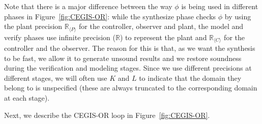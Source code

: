 \documentclass[a4paper,UKenglish]{lipics-v2018}
\newcommand{\mat}[1]{{#1}}
\begin{document}

Note that there is a major difference between the way $\phi$ is being used
in different phases in Figure~\ref{fig:CEGIS-OR}: while the {\sc synthesize}
phase checks $\phi$ by using the plant precision $\mathbb{R}_{\langle P
\rangle}$ for the controller, observer and plant, the {\sc model} and {\sc
verify} phases use infinite precision ($\mathbb{R}$) to represent the plant
and $\mathbb{R}_{\langle C \rangle}$ for the controller and the observer. 
The reason for this is that, as we want the synthesis to be fast, we allow
it to generate unsound results and we restore soundness during the
verification and modeling stages.  Since we use different precisions at
different stages, we will often use $\mat{K}$ and $\mat{L}$ to indicate that
the domain they belong to is unspecified (these are always truncated to the
corresponding domain at each stage).
%

\medskip

Next, we describe the CEGIS-OR loop in Figure~\ref{fig:CEGIS-OR}.
\end{document}
